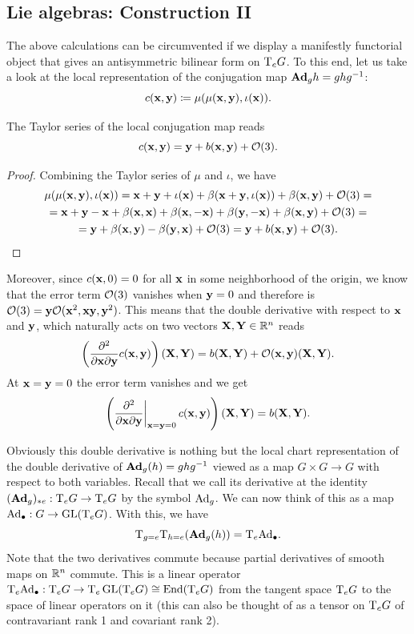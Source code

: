 \subsection{Lie algebras: Construction II}

The above calculations can be circumvented if we display a manifestly functorial object that gives an antisymmetric bilinear form on $\T_eG$. To this end, let us take a look at the local representation of the conjugation map $\Adg_g h=ghg^{-1}$:
\[c(\bf{x},\bf{y})\coloneqq \mu(\mu(\bf{x},\bf{y}),\iota(\bf{x})).\]

\begin{lem}
    The Taylor series of the local conjugation map reads
    \[c(\bf{x},\bf{y})=\bf{y}+b(\bf{x},\bf{y})+\calO(3).\]
\end{lem}
\begin{proof}
Combining the Taylor series of $\mu$ and $\iota$, we have
    \begin{multline}
        \mu(\mu(\bf{x},\bf{y}),\iota(\bf{x}))= \bf{x}+\bf{y}+\iota(\bf{x})+\beta(\bf{x}+\bf{y},\iota(\bf{x})) +\beta(\bf{x},\bf{y})+\calO(3)=\\
        =\bf{x}+\bf{y}-\bf{x}+\beta(\bf{x},\bf{x})+\beta(\bf{x},-\bf{x})+ \beta(\bf{y},-\bf{x})+ \beta(\bf{x},\bf{y})+\calO(3)=\\
        =\bf{y}+\beta(\bf{x},\bf{y})-\beta(\bf{y},\bf{x}) +\calO(3)=\bf{y}+b(\bf{x},\bf{y})+\calO(3).
    \end{multline}
\end{proof}

Moreover, since $c(\bf{x},0)=0$ for all $\bf{x}$ in some neighborhood of the origin, we know that the error term $\calO(3)$ vanishes when $\bf{y}=0$ and therefore is $\calO(3)=\bf{y}\calO(\bf{x}^2,\bf{x}\bf{y},\bf{y}^2)$. This means that the double derivative with respect to $\bf{x}$ and $\bf{y}$, which naturally acts on two vectors $\bf{X},\bf{Y}\in\bbR^n$ reads
\[\left(\frac{\partial^2}{\partial \bf{x}\partial \bf{y}}c(\bf{x},\bf{y})\right)(\bf{X},\bf{Y})=b(\bf{X},\bf{Y})+\calO(\bf{x},\bf{y})(\bf{X},\bf{Y}).\]
At $\bf{x}=\bf{y}=0$ the error term vanishes and we get
\[\left(\restr{\frac{\partial^2}{\partial \bf{x}\partial \bf{y}}}{\bf{x}=\bf{y}=0}c(\bf{x},\bf{y})\right)(\bf{X},\bf{Y})=b(\bf{X},\bf{Y}).\]

Obviously this double derivative is nothing but the local chart representation of the double derivative of $\Adg_g(h)= ghg^{-1}$ viewed as a map $G\times G\to G$ with respect to both variables. Recall that we call its derivative at the identity $(\Adg_g)_{\ast e}:\T_eG\to \T_e G$ by the symbol $\Ad_g$. We can now think of this as a map $\Ad_\bullet:G\to \GL(\T_e G)$. With this, we have
\[\T_{g=e}\T_{h=e}(\Adg_g(h))=\T_e \Ad_\bullet.\]
Note that the two derivatives commute because partial derivatives of smooth maps on $\bbR^n$ commute. This is a linear operator $\T_e \Ad_\bullet:\T_eG\to \T_e\GL(\T_e G)\cong \End(\T_eG)$ from the tangent space $\T_e G$ to the space of linear operators on it (this can also be thought of as a tensor on $\T_e G$ of contravariant rank 1 and covariant rank 2). 

